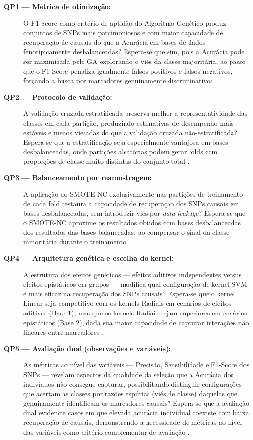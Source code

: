 \documentclass[
    12pt,
    a4paper,
    oneside,
    english,
    french,
    spanish,
    brazil
    ]{abntex2}
\begin{document}
\begin{description}
  \item[\textbf{QP1 --- Métrica de otimização:}] O F1-Score como critério de aptidão do Algoritmo Genético produz conjuntos de SNPs mais parcimoniosos e com maior capacidade de recuperação de causais do que a Acurácia em bases de dados fenotipicamente desbalanceadas? Espera-se que sim, pois a Acurácia pode ser maximizada pelo GA explorando o viés da classe majoritária, ao passo que o F1-Score penaliza igualmente falsos positivos e falsos negativos, forçando a busca por marcadores genuinamente discriminativos \cite{he2009learning}.

  \item[\textbf{QP2 --- Protocolo de validação:}] A validação cruzada estratificada preserva melhor a representatividade das classes em cada partição, produzindo estimativas de desempenho mais estáveis e menos viesadas do que a validação cruzada não-estratificada? Espera-se que a estratificação seja especialmente vantajosa em bases desbalanceadas, onde partições aleatórias podem gerar folds com proporções de classe muito distintas do conjunto total \cite{Kohavi1995}.

  \item[\textbf{QP3 --- Balanceamento por reamostragem:}] A aplicação do SMOTE-NC exclusivamente nas partições de treinamento de cada fold restaura a capacidade de recuperação dos SNPs causais em bases desbalanceadas, sem introduzir viés por \textit{data leakage}? Espera-se que o SMOTE-NC aproxime os resultados obtidos com bases desbalanceadas dos resultados das bases balanceadas, ao compensar o sinal da classe minoritária durante o treinamento \cite{chawla2002smote}.

  \item[\textbf{QP4 --- Arquitetura genética e escolha do kernel:}] A estrutura dos efeitos genéticos --- efeitos aditivos independentes versus efeitos epistáticos em grupos --- modifica qual configuração de kernel SVM é mais eficaz na recuperação dos SNPs causais? Espera-se que o kernel Linear seja competitivo com os kernels Radiais em cenários de efeitos aditivos (Base 1), mas que os kernels Radiais sejam superiores em cenários epistáticos (Base 2), dada sua maior capacidade de capturar interações não lineares entre marcadores \cite{vapnik95,scholkopf2002}.

  \item[\textbf{QP5 --- Avaliação dual (observações e variáveis):}] As métricas ao nível das variáveis --- Precisão, Sensibilidade e F1-Score dos SNPs --- revelam aspectos da qualidade da seleção que a Acurácia dos indivíduos não consegue capturar, possibilitando distinguir configurações que acertam as classes por razões espúrias (viés de classe) daquelas que genuinamente identificam os marcadores causais? Espera-se que a avaliação dual evidencie casos em que elevada acurácia individual coexiste com baixa recuperação de causais, demonstrando a necessidade de métricas ao nível das variáveis como critério complementar de avaliação \cite{Kollipara2026}.
\end{description}
\end{document}
